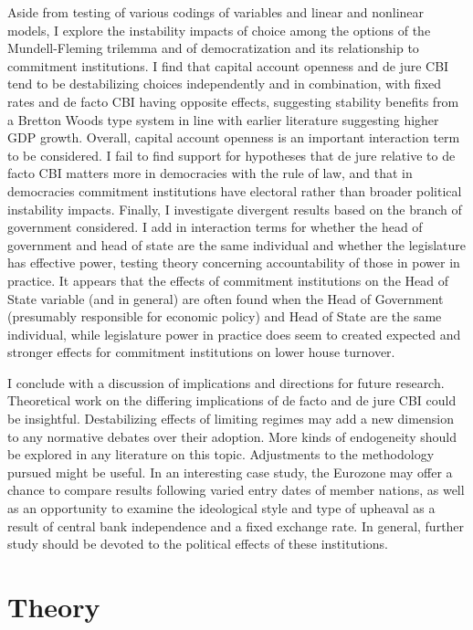 \documentclass{article}
\begin{document}
    Aside from testing of various codings of variables and linear and nonlinear models, I explore the instability impacts of choice among the options of the Mundell-Fleming trilemma and of democratization and its relationship to commitment institutions. I find that capital account openness and de jure CBI tend to be destabilizing choices independently and in combination, with fixed rates and de facto CBI having opposite effects, suggesting stability benefits from a Bretton Woods type system in line with earlier literature suggesting higher GDP growth. Overall, capital account openness is an important interaction term to be considered. I fail to find support for hypotheses that de jure relative to de facto CBI matters more in democracies with the rule of law, and that in democracies commitment institutions have electoral rather than broader political instability impacts. Finally, I investigate divergent results based on the branch of government considered. I add in interaction terms for whether the head of government and head of state are the same individual and whether the legislature has effective power, testing theory concerning accountability of those in power in practice. It appears that the effects of commitment institutions on the Head of State variable (and in general) are often found when the Head of Government (presumably responsible for economic policy) and Head of State are the same individual, while legislature power in practice does seem to created expected and stronger effects for commitment institutions on lower house turnover.

    I conclude with a discussion of implications and directions for future research. Theoretical work on the differing implications of de facto and de jure CBI could be insightful. Destabilizing effects of limiting regimes may add a new dimension to any normative debates over their adoption. More kinds of endogeneity should be explored in any literature on this topic. Adjustments to the methodology pursued might be useful. In an interesting case study, the Eurozone may offer a chance to compare results following varied entry dates of member nations, as well as an opportunity to examine the ideological style and type of upheaval as a result of central bank independence and a fixed exchange rate. In general, further study should be devoted to the political effects of these institutions.
    
    \section*{Theory}
\end{document}
